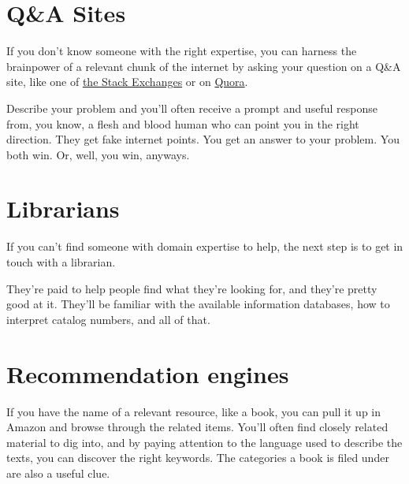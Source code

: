 \section{Q\&A Sites}

If you don't know someone with the right expertise, you can harness
the brainpower of a relevant chunk of the internet by asking your question on a
Q\&A site, like one of \href{http://stackexchange.com/sites#}{the Stack Exchanges} or on \href{http://www.quora.com/}{Quora}.

Describe your problem and you'll often receive a prompt and useful
response from, you know, a flesh and blood human who can point you in the right
direction. They get fake internet points. You get an answer to your problem. You
both win. Or, well, you win, anyways.

\section{Librarians}


If you can't find someone with domain expertise to help, the next step is to get
in touch with a librarian.

They're paid to help people find what they're looking for, and they're pretty
good at it. They'll be familiar with the available information databases, how to
interpret catalog numbers, and all of that.

\section{Recommendation engines}

If you have the name of a relevant resource, like a book, you can pull it up in
Amazon and browse through the related items. You'll often find closely related
material to dig into, and by paying attention to the language used to describe
the texts, you can discover the right keywords. The categories a book is filed
under are also a useful clue.

